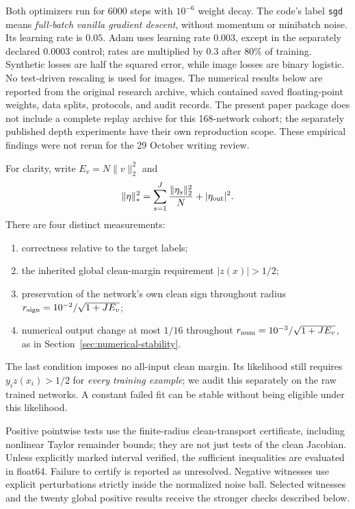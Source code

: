 Both optimizers run for 6000 steps with $10^{-6}$ weight decay.
The code's label \texttt{sgd} means \emph{full-batch vanilla gradient
descent}, without momentum or minibatch noise. Its learning rate is
$0.05$. Adam uses learning rate $0.003$, except in the separately
declared $0.0003$ control; rates are multiplied by $0.3$ after $80\%$
of training. Synthetic losses are half the squared error, while image
losses are binary logistic. No test-driven rescaling is used for images.
The numerical results below are reported from the original research
archive, which contained saved floating-point weights, data splits,
protocols, and audit records. The present paper package does not include
a complete replay archive for this 168-network cohort; the separately
published depth experiments have their own reproduction scope. These
empirical findings were not rerun for the 29 October writing review.

For clarity, write $E_v=N\|v\|_2^2$ and
\[
 \|\eta\|_*^2=\sum_{s=1}^J\frac{\|\eta_s\|_2^2}{N}
                    +|\eta_{\rm out}|^2.
\]
There are four distinct measurements:
\begin{enumerate}
\item correctness relative to the target labels;
\item the inherited global clean-margin requirement $|z(x)|>1/2$;
\item preservation of the network's own clean sign throughout radius
      $r_{\rm sign}=10^{-2}/\sqrt{1+JE_v}$;
\item numerical output change at most $1/16$ throughout
      $r_{\rm num}=10^{-3}/\sqrt{1+JE_v}$, as in
      Section~\ref{sec:numerical-stability}.
\end{enumerate}
The last condition imposes no all-input clean margin. Its likelihood still
requires $y_i z(x_i)>1/2$ for \emph{every training example}; we audit this
separately on the raw trained networks. A constant failed fit can be stable
without being eligible under this likelihood.

Positive pointwise tests use the finite-radius clean-transport certificate,
including nonlinear Taylor remainder bounds; they are not just tests of
the clean Jacobian. Unless explicitly marked interval verified, the
sufficient inequalities are evaluated in float64. Failure to certify is
reported as unresolved. Negative witnesses use explicit perturbations
strictly inside the normalized noise ball. Selected witnesses and the
twenty global positive results receive the stronger checks described below.

